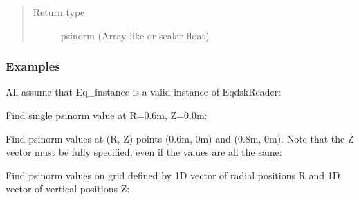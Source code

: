 \documentclass[letterpaper,10pt,english]{sphinxmanual}
\begin{document}
\begin{fulllineitems}
\begin{fulllineitems}
\begin{quote}
\begin{description}
\item[{Return type}] \leavevmode
psinorm (Array-like or scalar float)

\end{description}\end{quote}
\subsubsection*{Examples}

All assume that Eq\_instance is a valid instance of EqdskReader:

Find single psinorm value at R=0.6m, Z=0.0m:

\begin{sphinxVerbatim}[commandchars=\\\{\}]
   
\end{sphinxVerbatim}

Find psinorm values at (R, Z) points (0.6m, 0m) and (0.8m, 0m).
Note that the Z vector must be fully specified,
even if the values are all the same:

\begin{sphinxVerbatim}[commandchars=\\\{\}]
  \PYG{p}{[} \PYG{p}{]} \PYG{p}{[} \PYG{p}{]}
\end{sphinxVerbatim}

Find psinorm values on grid defined by 1D vector of radial positions
R and 1D vector of vertical positions Z:

\begin{sphinxVerbatim}[commandchars=\\\{\}]
    
\end{sphinxVerbatim}

\end{fulllineitems}



\end{fulllineitems}
\end{document}
